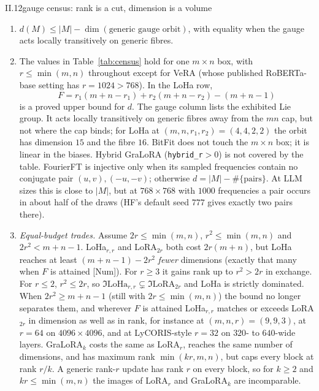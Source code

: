 \begin{proposition}{II.12}{gauge census: rank is a cut, dimension is a volume}
\begin{enumerate}[label=(\alph*)]
  \item $d(M)\le\lvert M\rvert-\dim(\text{generic gauge orbit})$, with equality when the gauge acts locally
    transitively on generic fibres.
  \item The values in Table~\ref{tab:census} hold for one $m\times n$ box, with $r\le\min(m,n)$ throughout except for
    VeRA (whose published RoBERTa-base setting has $r=1024>768$). In the LoHa row,
    \begin{equation*}
      F=r_1(m+n-r_1)+r_2(m+n-r_2)-(m+n-1)
    \end{equation*}
    is a proved upper bound for $d$. The gauge column lists the exhibited Lie group. It acts locally transitively on
    generic fibres away from the $mn$ cap, but not where the cap binds; for LoHa at $(m,n,r_1,r_2)=(4,4,2,2)$ the orbit
    has dimension $15$ and the fibre $16$. BitFit does not touch the $m\times n$ box; it is linear in the biases. Hybrid
    GraLoRA (\texttt{hybrid\_r}${}>0$) is not covered by the table. FourierFT is injective only when its sampled
    frequencies contain no conjugate pair $(u,v),(-u,-v)$; otherwise $d=\lvert M\rvert-\#\{\text{pairs}\}$. At LLM sizes
    this is close to $\lvert M\rvert$, but at $768\times768$ with $1000$ frequencies a pair occurs in about half of the
    draws (HF's default seed $777$ gives exactly two pairs there).
  \item \emph{Equal-budget trades.} Assume $2r\le\min(m,n)$, $r^2\le\min(m,n)$ and $2r^2<m+n-1$. LoHa$_{r,r}$ and
    LoRA$_{2r}$ both cost $2r(m+n)$, but LoHa reaches at least $(m+n-1)-2r^2$ \emph{fewer} dimensions (exactly that
    many when $F$ is attained [Num]). For $r\ge3$ it gains rank up to $r^2>2r$ in exchange. For $r\le2$, $r^2\le2r$, so
    $\Im\mathrm{LoHa}_{r,r}\subsetneq\Im\mathrm{LoRA}_{2r}$ and LoHa is strictly dominated. When $2r^2\ge m+n-1$ (still with $2r\le\min(m,n)$) the
    bound no longer separates them, and wherever $F$ is attained LoHa$_{r,r}$ matches or exceeds LoRA$_{2r}$ in
    dimension as well as in rank, for instance at $(m,n,r)=(9,9,3)$, at $r=64$ on $4096\times4096$, and at
    LyCORIS-style $r=32$ on $320$- to $640$-wide layers. GraLoRA$_k$ costs the same as LoRA$_r$, reaches the same
    number of dimensions, and has maximum rank $\min(kr,m,n)$, but caps every block at rank $r/k$. A generic rank-$r$
    update has rank $r$ on every block, so for $k\ge2$ and $kr\le\min(m,n)$ the images of LoRA$_r$ and GraLoRA$_k$ are
    incomparable.
\end{enumerate}
\end{proposition}

